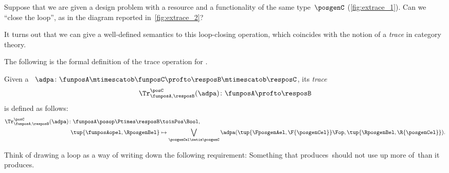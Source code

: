 Suppose that we are given a design problem with a resource and a functionality of the same type~$\posgenC$ (\cref{fig:extrace_1}).
Can we ``close the loop'', as in the diagram reported in~\cref{fig:extrace_2}?

It turns out that we can give a well-defined semantics to this loop-closing operation, which coincides with the notion of a \emph{trace} in category theory.

The following is the formal definition of the trace operation for .

\begin{definition}
    \label{def:dp-trace}
    Given a ~$\adpa\colon \funposA \mtimescatob \funposC \profto \resposB \mtimescatob \resposC$, its \emph{trace}
    \begin{equation}
        \Tr_{\funposA,\resposB}^\posC(\adpa) \colon \funposA \profto \resposB
    \end{equation}
    is defined as follows:
    \begin{equation}
        \label{eq:tracedef}
        \begin{aligned}
            \Tr_{\funposA,\resposB}^\posC(\adpa) \colon \funposA\posop \Ptimes \resposB & \toinPos \Bool, \\
            \tup{\funposAopel, \RposgenBel}                                             & \mapsto \bigvee_{\posgenCel \setin \posgenC}
            \adpa(\tup{\FposgenAel, \F{\posgenCel}}\Fop,
            \tup{\RposgenBel, \R{\posgenCel}}).
        \end{aligned}
    \end{equation}
\end{definition}

Think of drawing a loop as a way of writing down the following requirement:
Something that produces~\posC should not use up more of~\posC than it produces.


